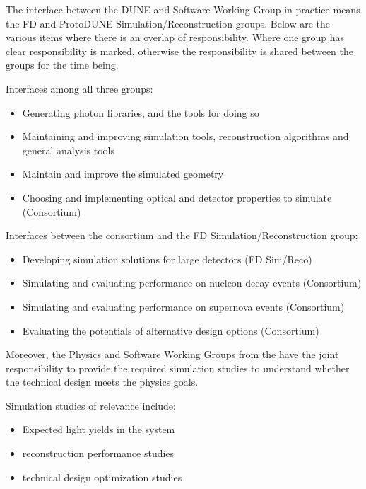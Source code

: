 The interface between the DUNE \single {} and Software Working Group in practice means the FD and ProtoDUNE Simulation/Reconstruction groups. Below are the various items where there is an overlap of responsibility. Where one group has clear responsibility is marked, otherwise the responsibility is shared between the groups for the time being. 

Interfaces among all three groups:

\begin{itemize}
    \item Generating photon libraries, and the tools for doing so
    \item Maintaining and improving simulation tools, reconstruction algorithms and general analysis tools
    \item Maintain and improve the simulated geometry
    \item Choosing and implementing optical and detector properties to simulate (Consortium)
\end{itemize}

Interfaces between the consortium and the FD Simulation/Reconstruction group:
\begin{itemize}
    \item Developing simulation solutions for large detectors (FD Sim/Reco)
    \item Simulating and evaluating performance on nucleon decay events (Consortium)
    \item Simulating and evaluating performance on supernova events (Consortium)
    \item Evaluating the potentials of alternative design options (Consortium)
\end{itemize}

Moreover, the Physics and Software Working Groups from the \single {} have the joint responsibility to provide the required simulation studies to understand whether the \single {} technical design meets the physics goals.

Simulation studies of relevance include:
\begin{itemize}
    \item Expected light yields in the \single {} system
    \item \single {} reconstruction performance studies
    \item \single {} technical design optimization studies
\end{itemize}
    
